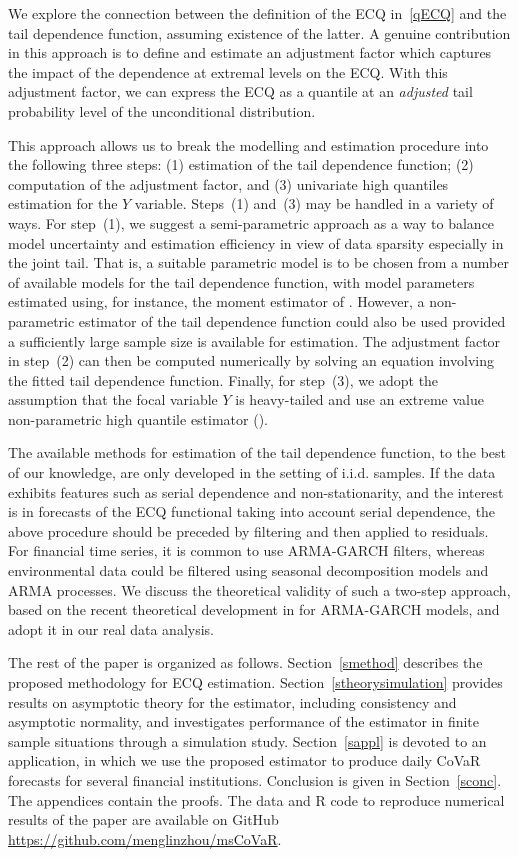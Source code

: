 \documentclass[11pt,letterpaper]{article}
\numberwithin{equation}{section}
\begin{document}
We explore the connection between the definition of the ECQ in~\eqref{qECQ} and the tail dependence function, assuming existence of the latter. A genuine contribution in this approach is to define and estimate an adjustment factor which captures the impact of the dependence  at extremal levels on the ECQ. With this adjustment factor, we can express the ECQ as a quantile at an \emph{adjusted} tail probability level of the unconditional distribution.

This approach allows us to break the modelling and estimation procedure into the following three steps: (1) estimation of the tail dependence function; (2) computation of the adjustment factor, and (3) univariate high quantiles estimation for the $Y$ variable. Steps~(1) and~(3) may be handled in a variety of ways. For step~(1), we suggest a semi-parametric approach as a way to balance model uncertainty and estimation efficiency in view of data sparsity especially in the joint tail. That is, a suitable parametric model is to be chosen from a number of available models for the tail dependence function, with model parameters estimated using, for instance, the moment estimator of \cite{Einmahl_etal2012}. However, a non-parametric estimator of the tail dependence function could also be used provided a sufficiently large sample size is available for estimation. The adjustment factor in step~(2) can then be computed numerically by solving an equation involving the fitted tail dependence function. Finally, for step~(3), we adopt the assumption that the focal variable $Y$ is heavy-tailed and use an extreme value non-parametric high quantile estimator (\cite{Weissman1978}). 

The available methods for estimation of the tail dependence function, to the best of our knowledge, are only developed in the setting of i.i.d. samples. If the data exhibits features such as serial dependence and non-stationarity, and the interest is in forecasts of the ECQ functional taking into account serial dependence, the above procedure should be preceded by filtering and then applied to residuals. For financial time series, it is common to use ARMA-GARCH filters, whereas environmental data could be filtered using seasonal decomposition models and ARMA processes. We discuss the theoretical validity of such a two-step approach, based on the recent theoretical development in \cite{Hoga2019} for ARMA-GARCH models, and adopt it in our real data analysis. 


The rest of the paper is organized as follows. Section~\ref{smethod} describes the proposed methodology for ECQ estimation. Section~\ref{stheorysimulation} provides results on asymptotic theory for the estimator, including consistency and asymptotic normality, and investigates performance of the estimator in finite sample situations through a simulation study. Section~\ref{sappl} is devoted to an application, in which we use the proposed estimator to produce daily CoVaR forecasts for several financial institutions. Conclusion is given in Section~\ref{sconc}. The appendices contain the proofs. The data and R code to reproduce numerical results of the paper are available on GitHub \href{https://github.com/menglinzhou/msCoVaR}{https://github.com/menglinzhou/msCoVaR}.
\end{document}
